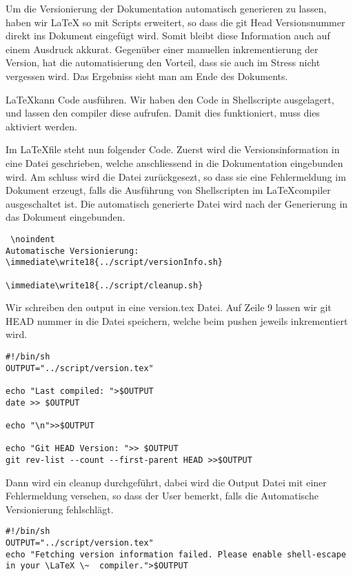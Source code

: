 Um die  Versionierung der Dokumentation automatisch generieren zu lassen, haben wir LaTeX so mit Scripts erweitert, so dass die git Head Versionsnummer
direkt ins Dokument eingefügt wird. Somit bleibt diese Information auch auf einem Ausdruck akkurat. Gegenüber einer manuellen inkrementierung der Version, hat die automatisierung den Vorteil, dass sie auch im Stress nicht vergessen wird. Das Ergebniss sieht man am Ende des Dokuments.

\LaTeX kann Code ausführen. Wir haben den Code in Shellscripte ausgelagert, und lassen den compiler diese aufrufen. Damit dies funktioniert, muss dies aktiviert werden. 

Im \LaTeX file steht nun folgender Code.
Zuerst wird die Versionsinformation in eine Datei  geschrieben, welche anschliessend in die Dokumentation eingebunden wird.
Am schluss wird die Datei zurückgesezt, so dass sie eine Fehlermeldung im Dokument erzeugt, falls die Ausführung von Shellscripten im \LaTeX compiler ausgeschaltet ist.
Die automatisch generierte Datei wird nach der Generierung in das Dokument eingebunden.
\begin{lstlisting}
 \noindent
Automatische Versionierung:
\immediate\write18{../script/versionInfo.sh}

\immediate\write18{../script/cleanup.sh}
\end{lstlisting}


Wir schreiben den output in eine version.tex Datei.  Auf Zeile 9 lassen wir git HEAD nummer in die Datei speichern, welche beim pushen jeweils inkrementiert wird.
\begin{lstlisting}
#!/bin/sh
OUTPUT="../script/version.tex"

echo "Last compiled: ">$OUTPUT
date >> $OUTPUT

echo "\n">>$OUTPUT

echo "Git HEAD Version: ">> $OUTPUT
git rev-list --count --first-parent HEAD >>$OUTPUT
\end{lstlisting}
Dann wird ein cleanup durchgeführt, dabei wird die Output Datei mit einer Fehlermeldung versehen, so dass der User bemerkt, falls die Automatische Versionierung fehlschlägt.
\begin{lstlisting}
#!/bin/sh
OUTPUT="../script/version.tex"
echo "Fetching version information failed. Please enable shell-escape in your \LaTeX \~  compiler.">$OUTPUT
\end{lstlisting}